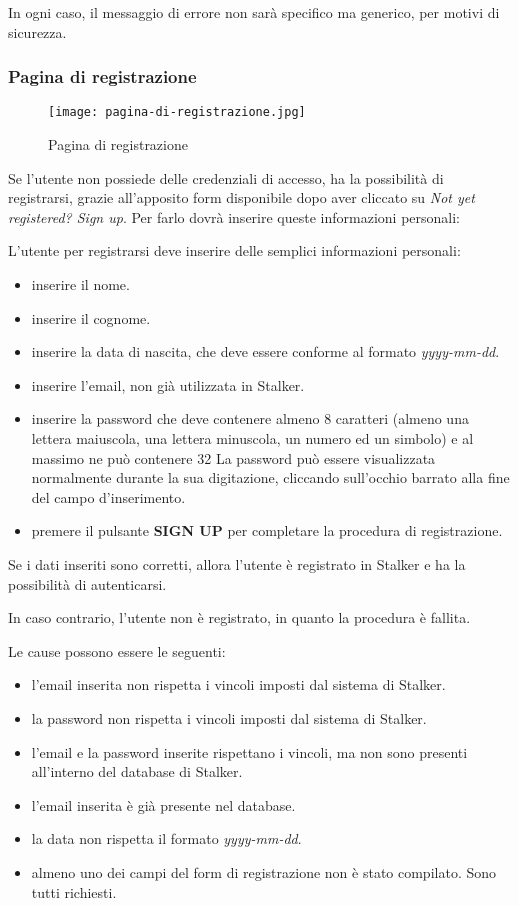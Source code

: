 \documentclass[../manuale-utente.tex]{subfiles}
\begin{document}
In ogni caso, il messaggio di errore non sarà specifico ma generico, per motivi di sicurezza.
\newpage

\subsubsection{Pagina di registrazione}%
\label{subs:pagina_di_registrazione}

\begin{figure}[H]
    \centering
    \texttt{[image: pagina-di-registrazione.jpg]}
    \caption{Pagina di registrazione}%
    \label{fig:mobile_app_pagina_di_registrazione}
\end{figure}

Se l'utente non possiede delle credenziali di accesso, ha la possibilità di registrarsi, grazie all'apposito form disponibile dopo aver cliccato su \textit{Not yet registered? Sign up}. Per farlo dovrà inserire queste informazioni personali:

L'utente per registrarsi deve inserire delle semplici informazioni personali:
\begin{itemize}
    \item inserire il nome.
    \item inserire il cognome.
    \item inserire la data di nascita, che deve essere conforme al formato \textit{yyyy-mm-dd}.
    \item inserire l'email, non già utilizzata in Stalker.
    \item inserire la password che deve contenere almeno 8 caratteri (almeno una lettera maiuscola, una lettera minuscola, un numero ed un simbolo) e al massimo ne può contenere 32 La password può essere visualizzata normalmente durante la sua digitazione, cliccando sull'occhio barrato alla fine del campo d'inserimento.
    \item premere il pulsante \textbf{SIGN UP} per completare la procedura di registrazione.
\end{itemize}

Se i dati inseriti sono corretti, allora l'utente è registrato in Stalker e ha la possibilità di autenticarsi.

In caso contrario, l'utente non è registrato, in quanto la procedura è fallita.

Le cause possono essere le seguenti:
\begin{itemize}
    \item l'email inserita non rispetta i vincoli imposti dal sistema di Stalker.
    \item la password non rispetta i vincoli imposti dal sistema di Stalker.
    \item l'email e la password inserite rispettano i vincoli, ma non sono presenti all'interno del database di Stalker.
    \item l'email inserita è già presente nel database.
    \item la data non rispetta il formato \textit{yyyy-mm-dd}.
    \item almeno uno dei campi del form di registrazione non è stato compilato. Sono tutti richiesti.
\end{itemize}
\end{document}
